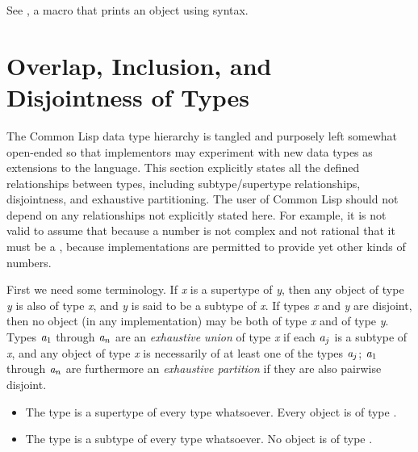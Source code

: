 \begin{newer}
See , a macro that prints an object using \cd{\#<}
syntax.
\end{newer}

\section{Overlap, Inclusion, and Disjointness of Types}
\label{DATA-TYPE-RELATIONSHIPS}

The Common Lisp data type hierarchy is tangled and purposely left somewhat
open-ended so that implementors may experiment with new data types
as extensions to the language.  This section explicitly states all
the defined relationships between types, including subtype/supertype
relationships,
disjointness, and exhaustive partitioning.  The user of Common Lisp
should not depend on any relationships not explicitly stated here.
For example, it is not valid to assume that because a number
is not complex and not rational that it must be a , because
implementations are permitted to provide yet other kinds of numbers.

First we need some terminology.
If \emph{x} is a supertype of \emph{y}, then any object of type \emph{y} is also
of type \emph{x}, and \emph{y} is said to be a subtype of \emph{x}.  If types
\emph{x} and \emph{y} are disjoint, then no object (in any implementation) may
be both of type \emph{x} and of type \emph{y}.  Types $\emph{a}_1$ through
$\emph{a}_{n}$ are an \emph{exhaustive union}
of type \emph{x} if each $\emph{a}_j$
is a subtype of \emph{x}, and any object of type \emph{x} is
necessarily of at least one of the types $\emph{a}_{j}$;
$\emph{a}_1$ through $\emph{a}_{n}$ are furthermore an \emph{exhaustive partition}
if they are also pairwise disjoint.

\begin{itemize}
\item
The type  is a supertype of every type whatsoever.
Every object is of type .

\item
The type {\nil} is a subtype of every type whatsoever.
No object is of type {\nil}.
\end{itemize}

